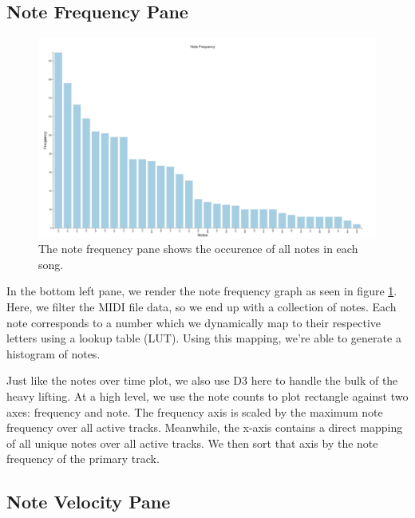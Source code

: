 \documentclass[journal]{vgtc}                %
\begin{document}
\subsection{Note Frequency Pane}

\begin{figure}[h]
  \centering
  \includegraphics[width=\columnwidth]{note-frequency-single-track}
  \caption{The note frequency pane shows the occurence of all notes in each song.}
  \label{fig:note-frequency}
\end{figure}

In the bottom left pane, we render the note frequency graph as seen in figure
\ref{fig:note-frequency}. Here, we filter the MIDI file data, so we end up with
a collection of notes. Each note corresponds to a number which we dynamically
map to their respective letters using a lookup table (LUT). Using this mapping,
we're able to generate a histogram of notes.

Just like the notes over time plot, we also use D3 here to handle the bulk of
the heavy lifting. At a high level, we use the note counts to plot rectangle
against two axes: frequency and note. The frequency axis is scaled by the
maximum note frequency over all active tracks. Meanwhile, the x-axis
contains a direct mapping of all unique notes over all active tracks. We then
sort that axis by the note frequency of the primary track.

\subsection{Note Velocity Pane}
\end{document}
